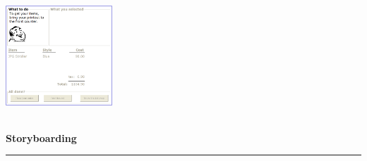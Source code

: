 \documentclass[pdf]{beamer}
\begin{document}
\begin{frame}
\begin{columns}[t]
\hspace{-1.3cm}
\includegraphics[width=4cm,height=4cm]{slide21pic4.png}
\end{columns}
\end{frame}



\begin{frame}
\vspace{8mm}
\textcolor{myBlue}{\textbf{\Large{Storyboarding}}}

\textcolor{red}{\rule{10cm}{1mm}}


\end{frame}
\end{document}
